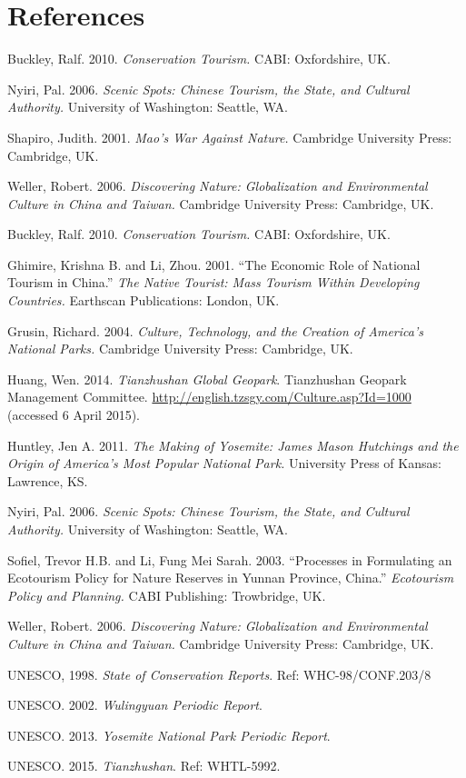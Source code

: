 \section*{References}


\bibent Buckley, Ralf. 2010. \textit{Conservation Tourism.} CABI: Oxfordshire,
UK.

\bibent Nyiri, Pal. 2006. \textit{Scenic Spots: Chinese Tourism, the State, and
Cultural Authority.} University of Washington: Seattle, WA.

\bibent Shapiro, Judith. 2001. \textit{Mao's War Against Nature.} Cambridge
University Press: Cambridge, UK.

\bibent Weller, Robert. 2006. \textit{Discovering Nature: Globalization and
Environmental Culture in China and Taiwan.} Cambridge University Press:
Cambridge, UK.

\bibent Buckley, Ralf. 2010. \textit{Conservation Tourism.} CABI: Oxfordshire,
UK.

\bibent Ghimire, Krishna B. and Li, Zhou. 2001. ``The Economic Role of National
Tourism in China.'' \textit{The Native Tourist: Mass Tourism Within Developing
Countries.} Earthscan Publications: London, UK.

\bibent Grusin, Richard. 2004. \textit{Culture, Technology, and the Creation of
America's National Parks.} Cambridge University Press: Cambridge, UK.

\bibent Huang, Wen. 2014. \textit{Tianzhushan Global Geopark}. Tianzhushan
Geopark Management Committee. \url{http://english.tzsgy.com/Culture.asp?Id=1000}
(accessed 6 April 2015).

\bibent Huntley, Jen A. 2011. \textit{The Making of Yosemite: James Mason
Hutchings and the Origin of America's Most Popular National Park.} University
Press of Kansas: Lawrence, KS.

\bibent Nyiri, Pal. 2006. \textit{Scenic Spots: Chinese Tourism, the State, and
Cultural Authority.} University of Washington: Seattle, WA.

\bibent Sofiel, Trevor H.B. and Li, Fung Mei Sarah. 2003. ``Processes in
Formulating an Ecotourism Policy for Nature Reserves in Yunnan Province,
China.'' \textit{Ecotourism Policy and Planning.} CABI Publishing: Trowbridge,
UK.

\bibent Weller, Robert. 2006. \textit{Discovering Nature: Globalization and
Environmental Culture in China and Taiwan.} Cambridge University Press:
Cambridge, UK.

\bibent UNESCO, 1998. \textit{State of Conservation Reports}. Ref:
WHC-98/CONF.203/8

\bibent UNESCO. 2002. \textit{Wulingyuan Periodic Report}.

\bibent UNESCO. 2013. \textit{Yosemite National Park Periodic Report}.

\bibent UNESCO. 2015. \textit{Tianzhushan}. Ref: WHTL-5992.
